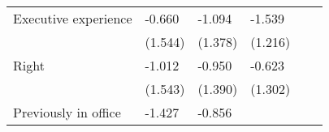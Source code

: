 \begin{table}[h]
{\begin{threeparttable}
\begin{tabular}{l*{5}{l}}
Executive experience           &      -0.660         &      -1.094         &      -1.539         &                     &                     \\
&     (1.544)         &     (1.378)         &     (1.216)         &                     &                     \\
Right               &      -1.012         &      -0.950         &      -0.623         &                     &                     \\
&     (1.543)         &     (1.390)         &     (1.302)         &                     &                     \\
Previously in office           &      -1.427         &      -0.856         &                     &                     &                     \\

\end{tabular}
\end{threeparttable}}
\end{table}
